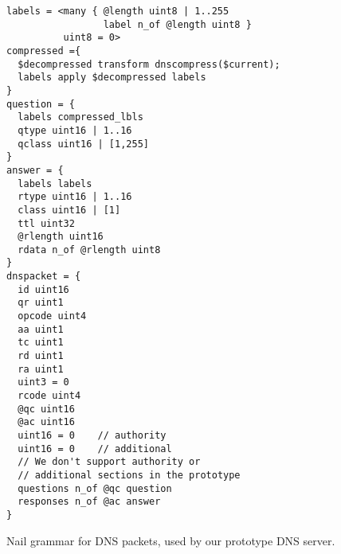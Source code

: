 \begin{figure}
\begin{verbatim}
labels = <many { @length uint8 | 1..255
                 label n_of @length uint8 }
          uint8 = 0>
compressed ={
  $decompressed transform dnscompress($current);
  labels apply $decompressed labels
}
question = {
  labels compressed_lbls
  qtype uint16 | 1..16
  qclass uint16 | [1,255]
}
answer = {
  labels labels
  rtype uint16 | 1..16
  class uint16 | [1]
  ttl uint32
  @rlength uint16
  rdata n_of @rlength uint8
}
dnspacket = {
  id uint16
  qr uint1
  opcode uint4
  aa uint1
  tc uint1
  rd uint1
  ra uint1
  uint3 = 0
  rcode uint4
  @qc uint16
  @ac uint16
  uint16 = 0    // authority
  uint16 = 0    // additional
  // We don't support authority or
  // additional sections in the prototype
  questions n_of @qc question
  responses n_of @ac answer
}
\end{verbatim}
\caption{Nail grammar for DNS packets, used by our prototype DNS server.}
\label{fig:dns-full}
\end{figure}
